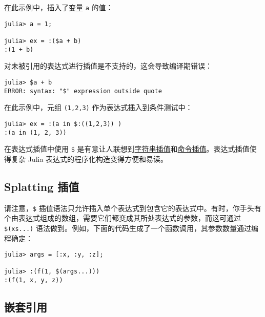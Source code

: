 在此示例中，插入了变量 \texttt{a} 的值：




\begin{verbatim}
julia> a = 1;

julia> ex = :($a + b)
:(1 + b)
\end{verbatim}



对未被引用的表达式进行插值是不支持的，这会导致编译期错误：




\begin{verbatim}
julia> $a + b
ERROR: syntax: "$" expression outside quote
\end{verbatim}



在此示例中，元组 \texttt{(1,2,3)} 作为表达式插入到条件测试中：




\begin{verbatim}
julia> ex = :(a in $:((1,2,3)) )
:(a in (1, 2, 3))
\end{verbatim}



在表达式插值中使用 \texttt{\$} 是有意让人联想到\hyperlink{4452850363638134205}{字符串插值}和\hyperlink{3603331931999023419}{命令插值}。表达式插值使得复杂 Julia 表达式的程序化构造变得方便和易读。



\hypertarget{12062767751485347352}{}


\subsection{Splatting 插值}



请注意，\texttt{\$} 插值语法只允许插入单个表达式到包含它的表达式中。有时，你手头有个由表达式组成的数组，需要它们都变成其所处表达式的参数，而这可通过 \texttt{\$(xs...)} 语法做到。例如，下面的代码生成了一个函数调用，其参数数量通过编程确定：




\begin{verbatim}
julia> args = [:x, :y, :z];

julia> :(f(1, $(args...)))
:(f(1, x, y, z))
\end{verbatim}



\hypertarget{15842920146318002847}{}


\subsection{嵌套引用}



